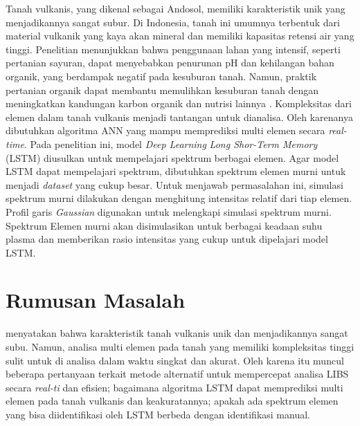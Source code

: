\par Tanah vulkanis, yang dikenal sebagai Andosol, memiliki karakteristik unik yang menjadikannya sangat subur. Di Indonesia, tanah ini umumnya terbentuk dari material vulkanik yang kaya akan mineral dan memiliki kapasitas retensi air yang tinggi. Penelitian menunjukkan bahwa penggunaan lahan yang intensif, seperti pertanian sayuran, dapat menyebabkan penurunan pH dan kehilangan bahan organik, yang berdampak negatif pada kesuburan tanah. Namun, praktik pertanian organik dapat membantu memulihkan kesuburan tanah dengan meningkatkan kandungan karbon organik dan nutrisi lainnya \parencite{fiantis2020land}. Kompleksitas dari elemen dalam tanah vulkanis menjadi tantangan untuk dianalisa. Oleh karenanya dibutuhkan algoritma ANN yang mampu memprediksi multi elemen secara \textit{real-time}. Pada penelitian ini, model \textit{Deep Learning} \textit{Long Shor-Term Memory} (LSTM) diusulkan untuk mempelajari spektrum berbagai elemen. Agar model LSTM dapat mempelajari spektrum, dibutuhkan spektrum elemen murni untuk menjadi \textit{dataset} yang cukup besar. Untuk menjawab permasalahan ini, simulasi spektrum murni dilakukan dengan menghitung intensitas relatif dari tiap elemen. Profil garis \textit{Gaussian} digunakan untuk melengkapi simulasi spektrum murni. Spektrum Elemen murni akan disimulasikan untuk berbagai keadaan suhu plasma dan memberikan rasio intensitas yang cukup untuk dipelajari model LSTM.


\section{Rumusan Masalah}
\par \parencite{fiantis2020land} menyatakan bahwa karakteristik tanah vulkanis unik dan menjadikannya sangat subu. Namun, analisa multi elemen pada tanah yang memiliki kompleksitas tinggi sulit untuk di analisa dalam waktu singkat dan akurat. Oleh karena itu muncul beberapa pertanyaan terkait metode alternatif untuk mempercepat analisa LIBS secara \textit{real-ti} dan efisien; bagaimana algoritma LSTM dapat memprediksi multi elemen pada tanah vulkanis dan keakuratannya; apakah ada spektrum elemen yang bisa diidentifikasi oleh LSTM berbeda dengan identifikasi manual.

